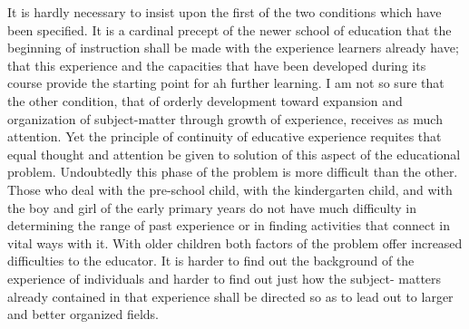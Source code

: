 It is hardly necessary to insist upon the first of the two conditions which have been 
specified. It is a cardinal precept of the newer school of education that the beginning of 
instruction shall be made with the experience learners already have; that this experience 
and the capacities that have been developed during its course provide the starting point 
for ah further learning. I am not so sure that the other condition, that of orderly 
development toward expansion and organization of subject-matter through growth of 
experience, receives as much attention. Yet the principle of continuity of educative 
experience requites that equal thought and attention be given to solution of this aspect of 
the educational problem. Undoubtedly this phase of the problem is more difficult than the 
other. Those who deal with the pre-school child, with the kindergarten child, and with the 
boy and girl of the early primary years do not have much difficulty in determining the 
range of past experience or in finding activities that connect in vital ways with it. With 
older children both factors of the problem offer increased difficulties to the educator. It is 
harder to find out the background of the experience of individuals and harder to find out 
just how the subject- matters already contained in that experience shall be directed so as 
to lead out to larger and better organized fields. 

